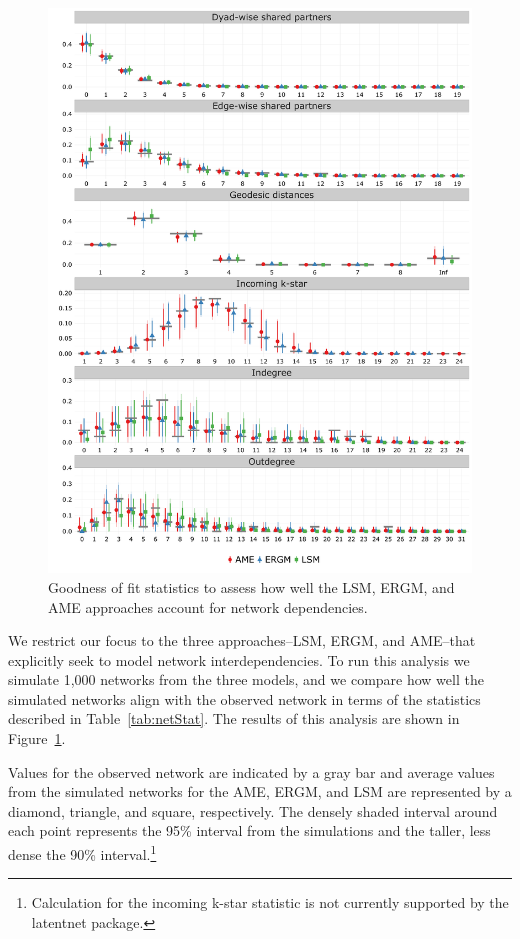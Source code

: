 \documentclass[12pt,pdflatex]{elsarticle}
\newcommand{\pkg}[1]{{\fontseries{b}\selectfont #1}}
\begin{document}
\begin{figure}[ht]
	\centering
	\includegraphics[width=1\textwidth]{ggGofAll}
	\caption{Goodness of fit statistics to assess how well the LSM, ERGM, and AME approaches account for network dependencies.}
	\label{fig:gofAll}
\end{figure}
\FloatBarrier

We restrict our focus to the three approaches--LSM, ERGM, and AME--that explicitly seek to model network interdependencies. To run this analysis we simulate 1,000 networks from the three models, and we compare how well the simulated networks align with the observed network in terms of the statistics described in Table~\ref{tab:netStat}. The results of this analysis are shown in Figure~\ref{fig:gofAll}. 

Values for the observed network are indicated by a gray bar and average values from the simulated networks for the AME, ERGM, and LSM are represented by a diamond, triangle, and square, respectively. The densely shaded interval around each point represents the 95\% interval from the simulations and the taller, less dense the 90\% interval.\footnote{Calculation for the incoming k-star statistic is not currently supported by the \pkg{latentnet} package.} 
\end{document}
